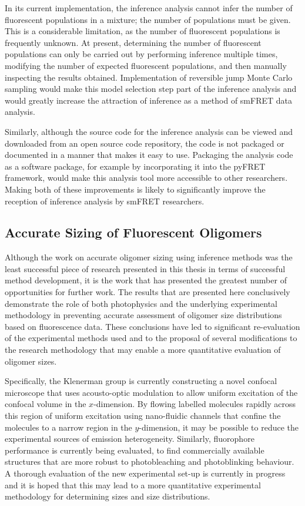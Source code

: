 In its current implementation, the inference analysis cannot infer the number of fluorescent populations in a mixture; the number of populations must be given. This is a considerable limitation, as the number of fluorescent populations is frequently unknown. At present, determining the number of fluorescent populations can only be carried out by performing inference multiple times, modifying the number of expected fluorescent populations, and then manually inspecting the results obtained. Implementation of reversible jump Monte Carlo sampling would make this model selection step part of the inference analysis and would greatly increase the attraction of inference as a method of smFRET data analysis. 

Similarly, although the source code for the inference analysis can be viewed and downloaded from an open source code repository, the code is not packaged or documented in a manner that makes it easy to use. Packaging the analysis code as a software package, for example by incorporating it into the pyFRET framework, would make this analysis tool more accessible to other researchers. Making both of these improvements is likely to significantly improve the reception of inference analysis by smFRET researchers.

\subsection{Accurate Sizing of Fluorescent Oligomers}
Although the work on accurate oligomer sizing using inference methods was the least successful piece of research presented in this thesis in terms of successful method development, it is the work that has presented the greatest number of opportunities for further work. The results that are presented here conclusively demonstrate the role of both photophysics and the underlying experimental methodology in preventing accurate assessment of oligomer size distributions based on fluorescence data. These conclusions have led to significant re-evaluation of the experimental methods used and to the proposal of several modifications to the research methodology that may enable a more quantitative evaluation of oligomer sizes.

Specifically, the Klenerman group is currently constructing a novel confocal microscope that uses acousto-optic modulation to allow uniform excitation of the confocal volume in the $x$-dimension. By flowing labelled molecules rapidly across this region of uniform excitation using nano-fluidic channels that confine the molecules to a narrow region in the $y$-dimension, it may be possible to reduce the experimental sources of emission heterogeneity. Similarly, fluorophore performance is currently being evaluated, to find commercially available structures that are more robust to photobleaching and photoblinking behaviour. A thorough evaluation of the new experimental set-up is currently in progress and it is hoped that this may lead to a more quantitative experimental methodology for determining sizes and size distributions.

